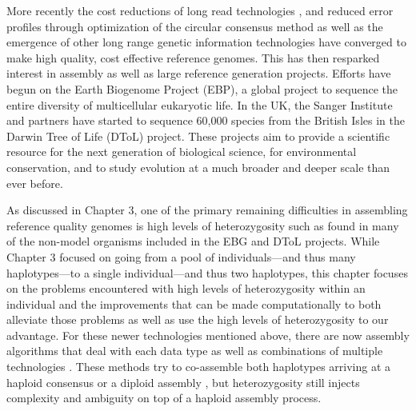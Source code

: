 \par{
More recently the cost reductions of long read technologies \cite{pacbio} \cite{oxford}, and reduced error profiles through optimization of the circular consensus method \cite{ccs}\cite{HIFI}
as well as the emergence of other long range genetic information technologies \cite{10xlinked} \cite{HiC} \cite{bionano} 
have converged to make high quality, cost effective reference genomes. This has then resparked interest in assembly 
as well as large reference generation projects. Efforts have begun on the Earth Biogenome Project (EBP)\cite{EBGP}, a global project to sequence the entire diversity of multicellular eukaryotic life. In the UK, the Sanger Institute and partners have started to sequence 60,000 species from the British Isles in the Darwin Tree of Life (DToL) project. These projects aim to provide a scientific resource for the next generation of biological science, for environmental conservation, and to study evolution at a much broader and deeper scale than ever before. 
} \\

\par{
As discussed in Chapter 3, one of the primary remaining difficulties in assembling reference quality genomes is high levels of heterozygosity such as found in many of the non-model organisms included in the EBG and DToL projects. While Chapter 3 focused on going from a pool of individuals---and thus many haplotypes---to a single individual---and thus two haplotypes, this chapter focuses on the problems encountered with high levels of heterozygosity within an individual and the improvements that can be made computationally to both alleviate those problems as well as use the high levels of heterozygosity to our advantage. 
For these newer technologies mentioned above, there are now assembly algorithms that deal with each data type \cite{falcon} \cite{supernova} \cite{bionano_assembly} 
as well as combinations of multiple technologies \cite{genemyers} \cite{hybrid10x} \cite{hicscafffirst}\cite{hicassembly}. 
 These methods try to co-assemble both haplotypes arriving at a haploid consensus \cite{watchtower} \cite{canu} 
 or a diploid assembly \cite{falconPHASE} \cite{supernova} \cite{hifiasm}\cite{dipasm}, but heterozygosity still injects complexity and ambiguity on top of a haploid assembly process.
} \\

